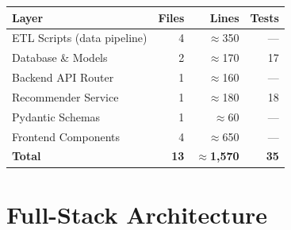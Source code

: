 \documentclass[12pt, a4paper]{article}
\begin{document}
\begin{infobox}[title={Module Metrics at a Glance}]
  \begin{tabular}{lrrr}
    \toprule
    \textbf{Layer} & \textbf{Files} & \textbf{Lines} & \textbf{Tests} \\
    \midrule
    ETL Scripts (data pipeline) & 4 & $\approx$350 & — \\
    Database \& Models          & 2 & $\approx$170 & 17 \\
    Backend API Router          & 1 & $\approx$160 & — \\
    Recommender Service         & 1 & $\approx$180 & 18 \\
    Pydantic Schemas            & 1 & $\approx$60  & — \\
    Frontend Components         & 4 & $\approx$650 & — \\
    \midrule
    \textbf{Total}              & \textbf{13} & $\approx$\textbf{1,570} & \textbf{35} \\
    \bottomrule
  \end{tabular}
\end{infobox}

\section{Full-Stack Architecture}
\end{document}

